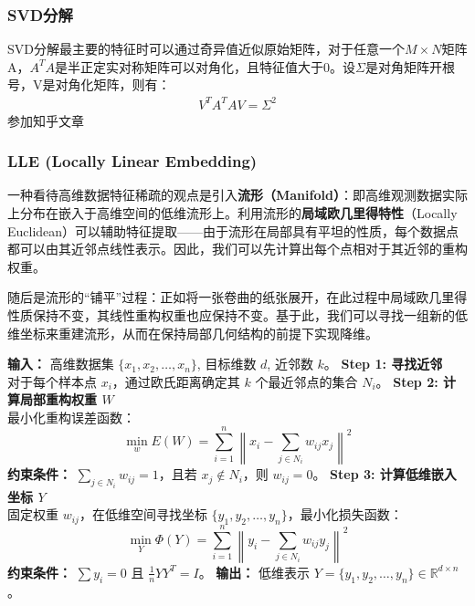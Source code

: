 \subsubsection{SVD分解}
SVD分解最主要的特征时可以通过奇异值近似原始矩阵，对于任意一个$M\times N$矩阵A，$A^TA$是半正定实对称矩阵可以对角化，且特征值大于0。设$\Sigma$是对角矩阵开根号，V是对角化矩阵，则有：
\begin{align}
    V^T A^T A V = \Sigma^2
\end{align}
参加知乎文章

\subsubsection{LLE (Locally Linear Embedding)}

一种看待高维数据特征稀疏的观点是引入\textbf{流形（Manifold）}：即高维观测数据实际上分布在嵌入于高维空间的低维流形上。利用流形的\textbf{局域欧几里得特性}（Locally Euclidean）可以辅助特征提取——由于流形在局部具有平坦的性质，每个数据点都可以由其近邻点线性表示。因此，我们可以先计算出每个点相对于其近邻的重构权重。

随后是流形的“铺平”过程：正如将一张卷曲的纸张展开，在此过程中局域欧几里得性质保持不变，其线性重构权重也应保持不变。基于此，我们可以寻找一组新的低维坐标来重建流形，从而在保持局部几何结构的前提下实现降维。

\begin{algorithm}[H]
\caption{局部线性嵌入 (LLE) 算法流程}
\begin{algorithmic}[1]
\State \textbf{输入：} 高维数据集 $\{x_1, x_2, \dots, x_n\}$, 目标维数 $d$, 近邻数 $k$。
\State \textbf{Step 1: 寻找近邻} \\
对于每个样本点 $x_i$，通过欧氏距离确定其 $k$ 个最近邻点的集合 $N_i$。
\State \textbf{Step 2: 计算局部重构权重 $W$} \\
最小化重构误差函数：
$$ \min_{w} E(W) = \sum_{i=1}^{n} \left\| x_i - \sum_{j \in N_i} w_{ij} x_j \right\|^2 $$
\textbf{约束条件：} $\sum_{j \in N_i} w_{ij} = 1$，且若 $x_j \notin N_i$，则 $w_{ij} = 0$。
\State \textbf{Step 3: 计算低维嵌入坐标 $Y$} \\
固定权重 $w_{ij}$，在低维空间寻找坐标 $\{y_1, y_2, \dots, y_n\}$，最小化损失函数：
$$ \min_{Y} \Phi(Y) = \sum_{i=1}^{n} \left\| y_i - \sum_{j \in N_i} w_{ij} y_j \right\|^2 $$
\textbf{约束条件：} $\sum y_i = 0$ 且 $\frac{1}{n}YY^T = I$。
\State \textbf{输出：} 低维表示 $Y = \{y_1, y_2, \dots, y_n\} \in \mathbb{R}^{d \times n}$。
\end{algorithmic}
\end{algorithm}

